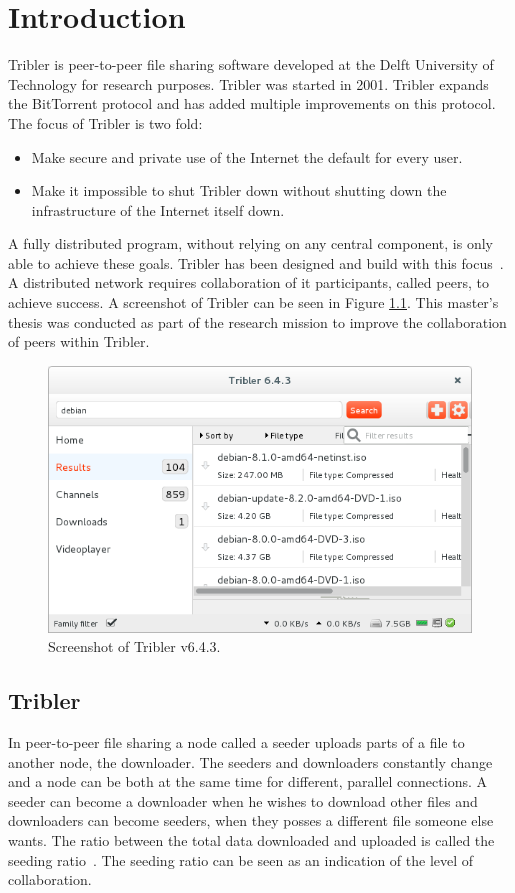 \chapter{Introduction}
\label{chp:introduction}
Tribler is peer-to-peer file sharing software developed at the Delft University of Technology for research purposes.
Tribler was started in 2001.
Tribler expands the BitTorrent protocol and has added multiple improvements on this protocol.
The focus of Tribler is two fold:
\begin{itemize}
    \item Make secure and private use of the Internet the default for every user.
    \item Make it impossible to shut Tribler down without shutting down the infrastructure of the Internet itself down.
\end{itemize}

A fully distributed program, without relying on any central component, is only able to achieve these goals.
Tribler has been designed and build with this focus~\cite{Pouwelse-tribler,Bakker-tribler}.
A distributed network requires collaboration of it participants, called peers, to achieve success.
A screenshot of Tribler can be seen in Figure \ref{fig:tribler-screenshot}.
This master's thesis was conducted as part of the research mission to improve the collaboration of peers within Tribler.

\begin{figure}
	\centerline{\includegraphics[scale=0.6]{introduction/figs/tribler-screenshot.png}}
	\caption{Screenshot of Tribler v6.4.3.}
	\label{fig:tribler-screenshot}
\end{figure}

\section{Tribler}
In peer-to-peer file sharing a node called a seeder uploads parts
of a file to another node, the downloader.
The seeders and downloaders constantly change
and a node can be both at the same time for different, parallel connections.
A seeder can become a downloader when he wishes to download other files
and downloaders can become seeders,
when they posses a different file someone else wants.
The ratio between the total data downloaded and uploaded is called the seeding ratio~\cite{Cohen-bittorrent}.
The seeding ratio can be seen as an indication of the level of collaboration.

